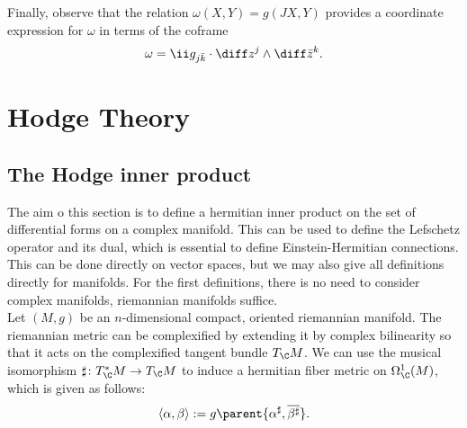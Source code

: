 Finally, observe that the relation \(\omega(X,Y)=g(JX,Y)\) provides a coordinate expression for \(\omega\) in terms of the coframe 
\[
\omega= \ii g_{j \bar{k}} \cdot \diff z^j \wedge \diff \bar{z}^k.
\]

\section{Hodge Theory}
\subsection{The Hodge inner product}
The aim o this section is to define a hermitian inner product on the set of differential forms on a complex manifold. This can be used to define the Lefschetz operator and its dual, which is essential to define Einstein-Hermitian connections. This can be done directly on vector spaces, but we may also give all definitions directly for manifolds. For the first definitions, there is no need to consider complex manifolds, riemannian manifolds suffice. \\

Let \((M,g)\) be an \(n\)-dimensional compact, oriented riemannian manifold. The riemannian metric can be complexified by extending it by complex bilinearity so that it acts on the complexified tangent bundle \(T_\C M\). We can use the musical isomorphism \(\sharp\colon T_\C^*M \to T_\C M\) to induce a hermitian fiber metric on \(\Omega_\C^1(M)\), which is given as follows:
\begin{equation} \label{eq_def_hodge_pointwise_inner_prod}
\langle \alpha, \beta \rangle :=g\parent{\alpha^\sharp, \overline{\beta^\sharp}}.
\end{equation}

